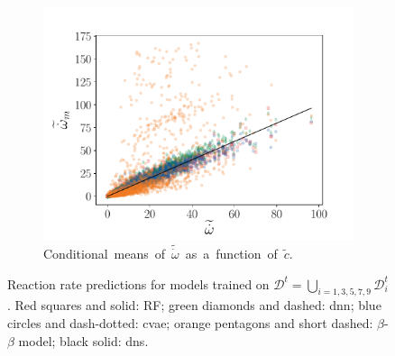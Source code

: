 \documentclass[review]{elsarticle}
\newcommand{\wt}[1]{\widetilde{#1}}
\begin{document}
\begin{figure}[!tbp]
  \begin{subfigure}[t]{0.48\textwidth}%
    \includegraphics[page=4,width=\textwidth, trim=0.5cm 0cm 1.5cm 1.3cm, clip=true]{./figs/convolution_skip.pdf}%
    \caption{\mbox{Conditional means of $\wt{\dot{\omega}}$ as a function of $\wt{c}$.}}%
  \end{subfigure}%
  \caption{Reaction rate predictions for models trained on $\mathcal{D}^t = \bigcup\limits_{i=1, 3, 5, 7, 9} \mathcal{D}_i^t$. Red squares and solid: RF; green diamonds and dashed: \gls{dnn}; blue circles and dash-dotted: \gls{cvae}; orange pentagons and short dashed: $\beta$-$\beta$ model; black solid: \gls{dns}.}\label{fig:convolution_skip}%
\end{figure}%
\end{document}
